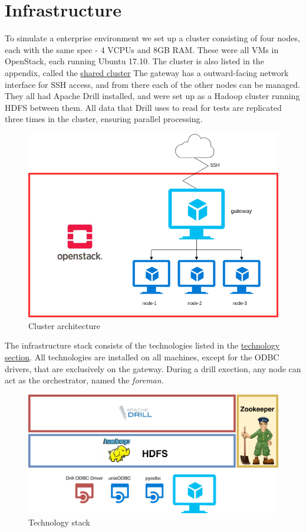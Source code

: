 \documentclass[a4paper,english]{report}
\begin{document}
		\section{Infrastructure}
			To simulate a enterprise environment we set up a cluster consisting of four nodes, each with the same spec - 4 VCPUs and 8GB RAM. These were all VMs in OpenStack, each running Ubuntu 17.10. The cluster is also listed in the appendix, called the \hyperref[table:cluster_shared]{shared cluster} The gateway has a outward-facing network interface for SSH access, and from there each of the other nodes can be managed. They all had Apache Drill installed, and were set up as a Hadoop cluster running HDFS between them. All data that Drill uses to read for tests are replicated three times in the cluster, ensuring parallel processing.
			\begin{figure}[h]
				\includegraphics[width=\textwidth]{cluster}
				\caption{Cluster architecture}
			\end{figure}
			The infrastructure stack consists of the technologies listed in the \hyperref[technology]{technology section}. All technologies are installed on all machines, except for the ODBC drivers, that are exclusively on the gateway. During a drill exection, any node can act as the orchestrator, named the \textit{foreman}.
			\begin{figure}[h]
				\includegraphics[width=\textwidth]{tech_stack}
				\caption{Technology stack}
			\end{figure}
		\clearpage
\end{document}
